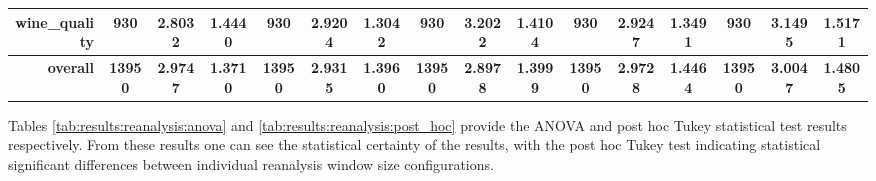 \begin{table}[htbp]
{\begin{tabular}{rccccccccccccccc}
			wine\_quality                       & 930                                     & \cellcolor[rgb]{ .776,  .937,  .808}\textcolor[rgb]{ 0,  .38,  0}{2.8032} & 1.4440          & 930                            & 2.9204                                                                    & 1.3042          & 930                             & 3.2022                                                                             & 1.4104          & 930                             & 2.9247                                                                    & 1.3491          & 930                             & 3.1495                                                                    & 1.5171          \\
			\midrule
			\textbf{overall}                    & \textbf{13950}                          & \textbf{2.9747}                                                           & \textbf{1.3710} & \textbf{13950}                 & \textbf{2.9315}                                                           & \textbf{1.3960} & \textbf{13950}                  & \cellcolor[rgb]{ .776,  .937,  .808}\textcolor[rgb]{ 0,  .38,  0}{\textbf{2.8978}} & \textbf{1.3999} & \textbf{13950}                  & \textbf{2.9728}                                                           & \textbf{1.4464} & \textbf{13950}                  & \textbf{3.0047}                                                           & \textbf{1.4805} \\
		\end{tabular}%
	}

\end{table}%

Tables \ref{tab:results:reanalysis:anova} and \ref{tab:results:reanalysis:post_hoc} provide the ANOVA and post hoc Tukey statistical test results respectively. From these results one can see the statistical certainty of the results, with the post hoc Tukey test indicating statistical significant differences between individual reanalysis window size configurations.

